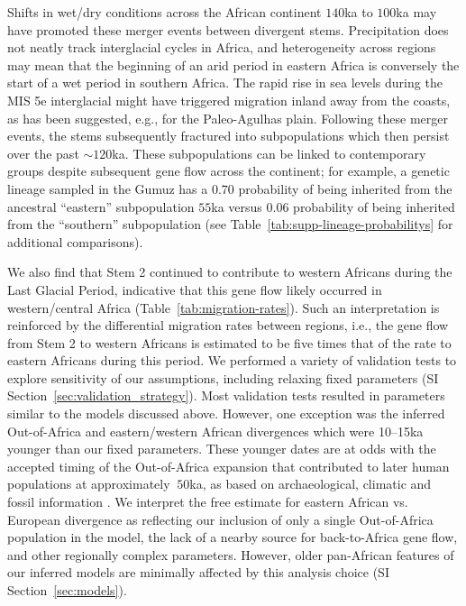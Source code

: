 \documentclass[]{article}
\begin{document}
Shifts in wet/dry conditions across the African continent $140$ka to $100$ka
may have promoted these merger events between divergent stems.  Precipitation
does not neatly track interglacial cycles in Africa, and heterogeneity across
regions may mean that the beginning of an arid period in eastern Africa is
conversely the start of a wet period in southern Africa\citep{Blome2012-lw}.
The rapid rise in sea levels during the MIS 5e interglacial might have
triggered migration inland away from the coasts, as has been suggested, e.g.,
for the Paleo-Agulhas plain\citep{Marean2014-pg}. Following these merger
events, the stems subsequently fractured into subpopulations which then persist
over the past $\sim120$ka. These subpopulations can be linked to contemporary
groups despite subsequent gene flow across the continent; for example, a
genetic lineage sampled in the Gumuz has a $0.70$ probability of being
inherited from the ancestral ``eastern'' subpopulation $55$ka versus $0.06$
probability of being inherited from the ``southern'' subpopulation (see
Table~\ref{tab:supp-lineage-probabilitys} for additional comparisons). 

We also find that Stem 2 continued to contribute to western Africans during the
Last Glacial Period, indicative that this gene flow likely occurred in
western/central Africa (Table~\ref{tab:migration-rates}). Such an
interpretation is reinforced by the differential migration rates between
regions, i.e., the gene flow from Stem 2 to western Africans is estimated to be
five times that of the rate to eastern Africans during this period. We
performed a variety of validation tests to explore sensitivity of our
assumptions, including relaxing fixed parameters (SI
Section~\ref{sec:validation_strategy}). Most validation tests resulted in
parameters similar to the models discussed above. However, one exception was
the inferred Out-of-Africa and eastern/western African divergences which were
10--15ka younger than our fixed parameters. These younger dates are at odds
with the accepted timing of the Out-of-Africa expansion that contributed to
later human populations at approximately $\>50$ka, as based on archaeological,
climatic and fossil information \citep{Fu2014-am,Groucutt2015-do,
Prufer2021-ao,Beyer2021-ym}. We interpret the free estimate for eastern African
vs. European divergence as reflecting our inclusion of only a single
Out-of-Africa population in the model, the lack of a nearby source for
back-to-Africa gene flow, and other regionally complex parameters. However,
older pan-African features of our inferred models are minimally affected by
this analysis choice (SI Section~\ref{sec:models}).
\end{document}
